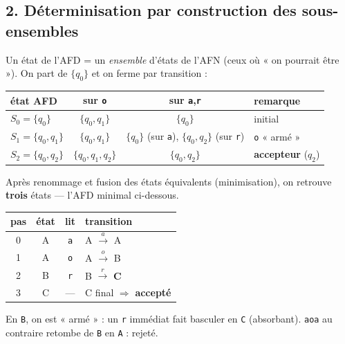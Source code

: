 \documentclass[11pt,a4paper]{scrartcl}
\begin{document}
\subsection*{2. Déterminisation par construction des sous-ensembles}
Un état de l'AFD = un \emph{ensemble} d'états de l'AFN (ceux où « on pourrait être »).
On part de $\{q_0\}$ et on ferme par transition :

\begin{center}\small
\begin{tabular}{@{}lccl@{}}
\toprule
état AFD & sur \texttt{o} & sur \texttt{a},\texttt{r} & remarque\\\midrule
$S_0=\{q_0\}$ & $\{q_0,q_1\}$ & $\{q_0\}$ & initial\\
$S_1=\{q_0,q_1\}$ & $\{q_0,q_1\}$ & $\{q_0\}$ (sur \texttt a), $\{q_0,q_2\}$ (sur \texttt r) & \texttt o « armé »\\
$S_2=\{q_0,q_2\}$ & $\{q_0,q_1,q_2\}$ & $\{q_0,q_2\}$ & \textbf{accepteur} ($q_2$)\\
\bottomrule
\end{tabular}
\end{center}
\noindent Après renommage et fusion des états équivalents (minimisation), on retrouve
\textbf{trois} états — l'AFD minimal ci-dessous.

\begin{center}
\end{center}

\begin{exemple}
\begin{center}\small
\begin{tabular}{@{}cccl@{}}
\toprule
pas & état & lit & transition\\\midrule
0 & A & \texttt a & A $\xrightarrow{a}$ A\\
1 & A & \texttt o & A $\xrightarrow{o}$ B\\
2 & B & \texttt r & B $\xrightarrow{r}$ \textbf{C}\\
3 & C & — & C final $\Rightarrow$ \textbf{accepté}\\
\bottomrule
\end{tabular}
\end{center}
En \texttt{B}, on est « armé » : un \texttt r immédiat fait basculer en \texttt C
(absorbant). \texttt{aoa} au contraire retombe de \texttt B en \texttt A : rejeté.
\end{exemple}
\end{document}
